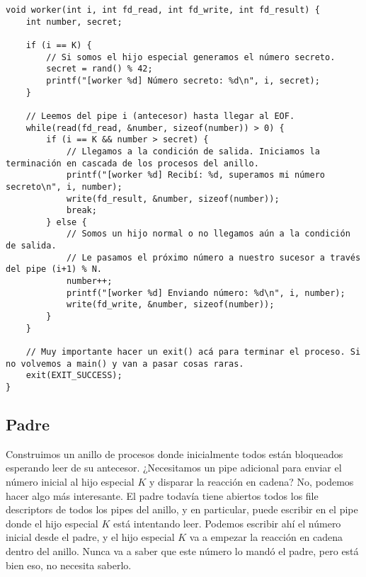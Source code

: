 \begin{verbatim}
void worker(int i, int fd_read, int fd_write, int fd_result) {
    int number, secret;

    if (i == K) {
        // Si somos el hijo especial generamos el número secreto.
        secret = rand() % 42;
        printf("[worker %d] Número secreto: %d\n", i, secret);
    }

    // Leemos del pipe i (antecesor) hasta llegar al EOF.
    while(read(fd_read, &number, sizeof(number)) > 0) {
        if (i == K && number > secret) {
            // Llegamos a la condición de salida. Iniciamos la terminación en cascada de los procesos del anillo.
            printf("[worker %d] Recibí: %d, superamos mi número secreto\n", i, number);
            write(fd_result, &number, sizeof(number));
            break;
        } else {
            // Somos un hijo normal o no llegamos aún a la condición de salida.
            // Le pasamos el próximo número a nuestro sucesor a través del pipe (i+1) % N.
            number++;
            printf("[worker %d] Enviando número: %d\n", i, number);
            write(fd_write, &number, sizeof(number));
        }
    }

    // Muy importante hacer un exit() acá para terminar el proceso. Si no volvemos a main() y van a pasar cosas raras.
    exit(EXIT_SUCCESS);
}
\end{verbatim}

\subsection*{Padre}

Construimos un anillo de procesos donde inicialmente todos están bloqueados esperando leer de su antecesor. ¿Necesitamos un pipe adicional para enviar el número inicial al hijo especial $K$ y disparar la reacción en cadena? No, podemos hacer algo más interesante. El padre todavía tiene abiertos todos los file descriptors de todos los pipes del anillo, y en particular, puede escribir en el pipe donde el hijo especial $K$ está intentando leer. Podemos escribir ahí el número inicial desde el padre, y el hijo especial $K$ va a empezar la reacción en cadena dentro del anillo. Nunca va a saber que este número lo mandó el padre, pero está bien eso, no necesita saberlo.


